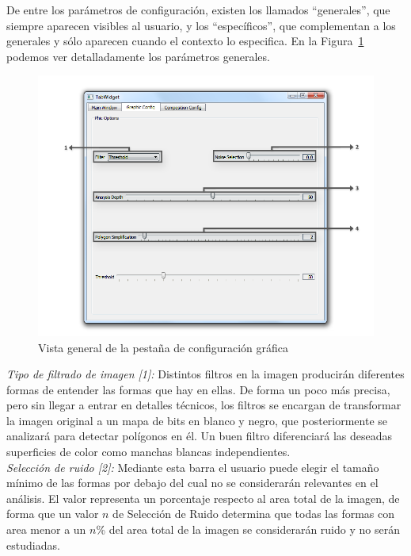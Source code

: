 		De entre los parámetros de configuración, existen los llamados ``generales'', que siempre aparecen visibles al usuario, y los ``específicos'', que complementan a los generales y sólo aparecen cuando el contexto lo especifica. En la Figura~\ref{fig:interfazgraphic} podemos ver detalladamente los parámetros generales.\\
		
		\begin{figure}[htbp]
		\centering
		\hspace*{-0.9in}
		\includegraphics[scale=0.57]{graphics/interfazgraphic.png}
		\caption{Vista general de la pestaña de configuración gráfica}
		\label{fig:interfazgraphic}
		\end{figure}
		
		\noindent\textit{Tipo de filtrado de imagen [1]:} Distintos filtros en la imagen producirán diferentes formas de entender las formas que hay en ellas. De forma un poco más precisa, pero sin llegar a entrar en detalles técnicos, los filtros se encargan de transformar la imagen original a un mapa de bits en blanco y negro, que posteriormente se analizará para detectar polígonos en él. Un buen filtro diferenciará las deseadas superficies de color como manchas blancas independientes.\\
		
		\noindent\textit{Selección de ruido [2]:} Mediante esta barra el usuario puede elegir el tamaño mínimo de las formas por debajo del cual no se considerarán relevantes en el análisis. El valor representa un porcentaje respecto al area total de la imagen, de forma que un valor $n$ de Selección de Ruido determina que todas las formas con area menor a un $n$\% del area total de la imagen se considerarán ruido y no serán estudiadas.\\
		
